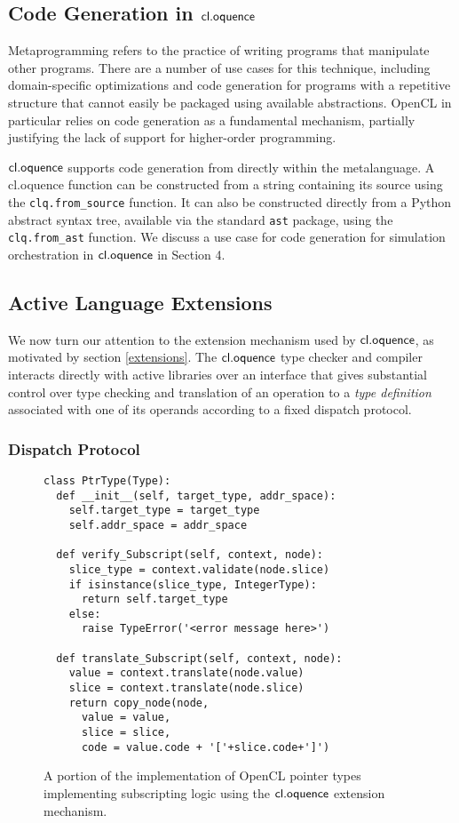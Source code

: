 \documentclass[10pt, conference, compsocconf]{IEEEtran}
\begin{document}
\subsection{Code Generation in $\textsf{cl.oquence}$}
Metaprogramming refers to the practice of writing programs that manipulate other programs. There are a number of use cases for this technique, including domain-specific optimizations and code generation for programs with a repetitive structure that cannot easily be packaged using available abstractions. OpenCL in particular relies on code generation as a fundamental mechanism, partially justifying the lack of support for higher-order programming.

$\textsf{cl.oquence}$ supports code generation from directly within the metalanguage. A cl.oquence function can be constructed from a string containing its source using the \verb|clq.from_source| function. It can also be constructed directly from a Python abstract syntax tree, available via the standard \verb|ast| package, using the \verb|clq.from_ast| function. We discuss a use case for code generation for simulation orchestration in $\textsf{cl.oquence}$ in Section 4.

\subsection{Active Language Extensions}
We now turn our attention to the extension mechanism used by $\textsf{cl.oquence}$, as motivated by section \ref{extensions}. The $\textsf{cl.oquence}$ type checker and compiler interacts directly with active libraries over an interface that gives substantial control over type checking and translation of an operation to a {\it type definition} associated with one of its operands according to a fixed dispatch protocol.

\subsubsection{Dispatch Protocol}
\begin{figure}\small{
\begin{verbatim}
class PtrType(Type):
  def __init__(self, target_type, addr_space):
    self.target_type = target_type
    self.addr_space = addr_space
        
  def verify_Subscript(self, context, node):
    slice_type = context.validate(node.slice)
    if isinstance(slice_type, IntegerType):
      return self.target_type
    else: 
      raise TypeError('<error message here>')
       
  def translate_Subscript(self, context, node):
    value = context.translate(node.value)
    slice = context.translate(node.slice)
    return copy_node(node, 
      value = value,
      slice = slice,    
      code = value.code + '['+slice.code+']')
\end{verbatim}}
\caption{A portion of the implementation of OpenCL pointer types implementing subscripting logic using the $\textsf{cl.oquence}$ extension mechanism.}
\label{pointers}
\end{figure}
\end{document}
